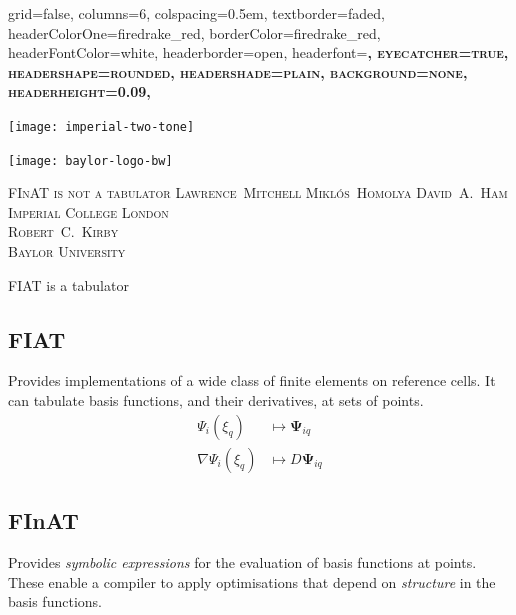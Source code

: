 \documentclass[cmyk,luatex,a0paper,portrait]{baposter}
\begin{document}
\begin{poster}{
    grid=false,
    columns=6,
    colspacing=0.5em,
    textborder=faded,
    headerColorOne=firedrake_red,
    borderColor=firedrake_red,
    headerFontColor=white,
    headerborder=open,
    headerfont=\bfseries\Large\scshape,
    eyecatcher=true,
    headershape=rounded,
    headershade=plain,
    background=none,
    headerheight=0.09\textheight,
  }
  {
    \begin{minipage}[l]{0.3\textwidth}
      \texttt{[image: imperial-two-tone]}
      \par
      \vspace{0.2cm}
      \texttt{[image: baylor-logo-bw]}
    \end{minipage}
  } 
  {\scshape\LARGE FInAT is not a tabulator}
  {\vspace{0.2em}\small\scshape Lawrence~Mitchell\quad
    Mikl\'os~Homolya \quad David~A.~Ham\\[0.15em]Imperial College London
    \\[0.5em]  
    Robert~C.~Kirby\\[0.15em]Baylor University}
  {
  }

  \begin{posterbox}[name=introduction,span=6,column=0,row=0]{FIAT is a
      tabulator}
    \begin{minipage}[t]{0.49\textwidth}%
      \subsection*{FIAT}
      \vspace{-0.25\baselineskip}
      \raggedright
      Provides implementations of a wide class of finite elements on
      reference cells. It can tabulate basis functions, and their
      derivatives, at sets of points.  \vspace{-1\baselineskip}
      \begin{align*}
        \Psi_i(\xi_q) &\mapsto \mathbf{\Psi}_{iq}\\
        \nabla\Psi_i(\xi_q) &\mapsto D\mathbf{\Psi}_{iq}
      \end{align*}
    \end{minipage}%
    \hspace{0.02\textwidth}%
    \begin{minipage}[t]{0.49\textwidth}%
      \raggedright
      \subsection*{FInAT}
      \vspace{-0.25\baselineskip}
      Provides \emph{symbolic expressions} for the evaluation of
      basis functions at points.  These enable a compiler to apply
      optimisations that depend on \emph{structure} in the basis
      functions.


\end{minipage}
\end{posterbox}
\end{poster}
\end{document}
